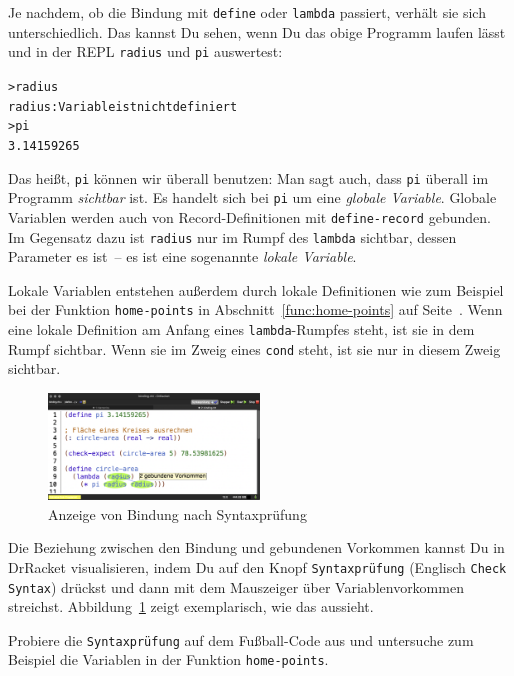 Je nachdem, ob die Bindung mit \lstinline{define} oder
\lstinline{lambda} passiert, verhält sie sich unterschiedlich.  Das
kannst Du sehen, wenn Du das obige Programm laufen lässt und in der
REPL \lstinline{radius} und \lstinline{pi} auswertest:
%
\begin{alltt}
> radius
{\color{red}radius: Variable ist nicht definiert}
> pi
{\color{blue}3.14159265}
\end{alltt}
%
Das heißt, \lstinline{pi} können wir überall benutzen: Man sagt auch,
dass \lstinline{pi} überall im Programm
\textit{sichtbar} ist.  Es handelt sich bei
\lstinline{pi} um eine \textit{globale Variable}.  Globale Variablen werden auch von
Record-Definitionen mit \lstinline{define-record} gebunden.
Im Gegensatz dazu ist \lstinline{radius} nur im Rumpf des
\lstinline{lambda} sichtbar, dessen Parameter es ist~-- es ist eine
sogenannte \textit{lokale Variable}.

Lokale Variablen entstehen außerdem durch lokale Definitionen wie zum
Beispiel bei der Funktion \lstinline{home-points} in
Abschnitt~\ref{func:home-points} auf Seite~\pageref{func:home-points}.
Wenn eine lokale Definition am Anfang eines \lstinline{lambda}-Rumpfes
steht, ist sie in dem Rumpf sichtbar.  Wenn sie im Zweig eines
\lstinline{cond} steht, ist sie nur in diesem Zweig sichtbar.

\begin{figure}[tb]
  \centering
  \includegraphics[width=0.5\textwidth]{higher-order/binding}
  \caption{Anzeige von Bindung nach Syntaxprüfung}
  \label{fig:binding}
\end{figure}

Die Beziehung zwischen den Bindung und gebundenen Vorkommen kannst
Du in DrRacket visualisieren, indem Du auf den Knopf
\texttt{Syntaxprüfung} (Englisch \texttt{Check Syntax})
drückst
und dann mit dem Mauszeiger über Variablenvorkommen
streichst.  Abbildung~\ref{fig:binding} zeigt exemplarisch, wie das aussieht.

\begin{aufgabeinline}
  Probiere die \texttt{Syntaxprüfung} auf dem Fußball-Code aus und
  untersuche zum Beispiel die Variablen in der Funktion
  \lstinline{home-points}.
\end{aufgabeinline}

